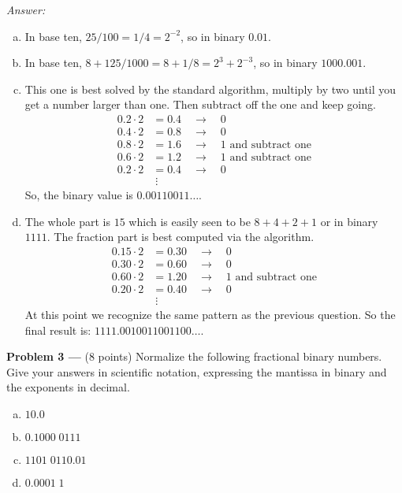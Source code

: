 \documentclass[11pt]{article}
\newcommand{\problem}[1]{\textbf{Problem #1 ---} }
\newcommand{\answer}{{\color{red}\textit{Answer: }}}
\begin{document}
\answer
{\color{blue}
\begin{enumerate}[(a)]
    \item In base ten, $25/100 = 1/4 = 2^{-2}$, so in binary $0.01$.
    \item In base ten, $8 + 125/1000 = 8 + 1/8 = 2^3 + 2^{-3}$, so in binary $1000.001$.
    \item This one is best solved by the standard algorithm, multiply by two until you get a number larger than one.  Then subtract off the one and keep going.
	\begin{align*}
	    0.2 \cdot 2 &= 0.4 \quad\rightarrow\quad 0\\
	    0.4 \cdot 2 &= 0.8 \quad\rightarrow\quad 0\\
	    0.8 \cdot 2 &= 1.6 \quad\rightarrow\quad 1 \text{ and subtract one}\\
	    0.6 \cdot 2 &= 1.2 \quad\rightarrow\quad 1 \text{ and subtract one}\\
	    0.2 \cdot 2 &= 0.4 \quad\rightarrow\quad 0\\
	    &\;\vdots
	\end{align*}
	So, the binary value is $0.00110011\ldots.$
    \item The whole part is $15$ which is easily seen to be $8+4+2+1$ or in binary $1111$.  The fraction part is best computed via the algorithm.
	\begin{align*}
	    0.15 \cdot 2 &= 0.30 \quad\rightarrow\quad 0\\
	    0.30 \cdot 2 &= 0.60 \quad\rightarrow\quad 0\\
	    0.60 \cdot 2 &= 1.20 \quad\rightarrow\quad 1 \text{ and subtract one}\\
	    0.20 \cdot 2 &= 0.40 \quad\rightarrow\quad 0\\
	    &\;\vdots
	\end{align*}
	At this point we recognize the same pattern as the previous question.  So the final result is: $1111.0010011001100\ldots.$
\end{enumerate}
}

\problem{3}(8 points) Normalize the following fractional binary numbers.  Give your answers in scientific notation, expressing the mantissa in binary and the exponents in decimal.
\begin{enumerate}[(a)]
    \item $10.0$
    \item $0.1000\;0111$
    \item $1101\;0110.01$
    \item $0.0001\;1$
\end{enumerate}
\end{document}

